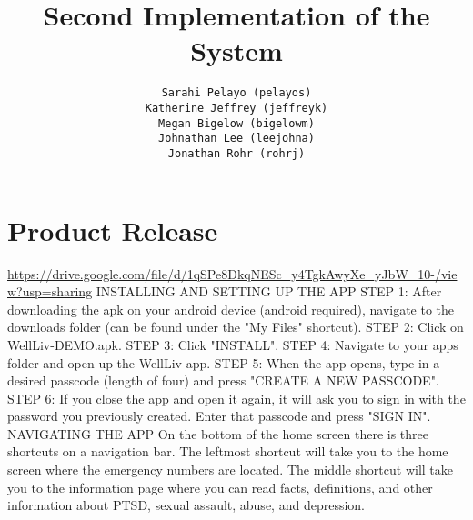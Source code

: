 \documentclass[letterpaper,12pt,titlepage]{article}
\title{Second Implementation of the System}
\author{
  \texttt{Sarahi Pelayo (pelayos)}
  \\[.5ex]
  \texttt{Katherine Jeffrey (jeffreyk)}
  \\[.5ex]
  \texttt{Megan Bigelow (bigelowm)}
  \\[.5ex]
  \texttt{Johnathan Lee (leejohna)}
  \\[.5ex]
  \texttt{Jonathan Rohr (rohrj)}
}
\begin{document}
\maketitle

\section{Product Release}

\underline{https://drive.google.com/file/d/1qSPe8DkqNESc\_y4TgkAwyXe\_yJbW\_10-/view?usp=sharing}
\newline
\newline
INSTALLING AND SETTING UP THE APP
\newline
\newline
STEP 1: After downloading the apk on your android device (android required), navigate to the downloads folder (can be found under the "My Files" shortcut).
\newline
\newline
STEP 2: Click on WellLiv-DEMO.apk.
\newline
\newline
STEP 3: Click "INSTALL".
\newline
\newline
STEP 4: Navigate to your apps folder and open up the WellLiv app.
\newline
\newline
STEP 5: When the app opens, type in a desired passcode (length of four) and press "CREATE A NEW PASSCODE".
\newline
\newline
STEP 6: If you close the app and open it again, it will ask you to sign in with the password you previously created. Enter that passcode and press "SIGN IN".
\newline
\newline
NAVIGATING THE APP
\newline
\newline
On the bottom of the home screen there is three shortcuts on a navigation bar.
\newline
\newline
The leftmost shortcut will take you to the home screen where the emergency numbers are located.
\newline
\newline
The middle shortcut will take you to the information page where you can read facts, definitions, and other information about PTSD, sexual assault, abuse, and depression.
\newline
\end{document}

